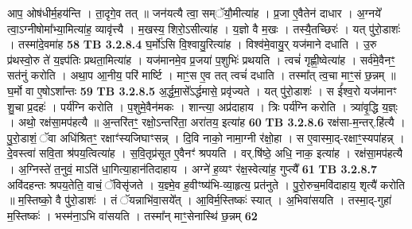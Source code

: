 \documentclass[17pt]{extarticle}
\begin{document}
{{{{{{{{{{{{{{{{{{{                  आप॒ ओष॑धीर्म॒हय॑न्ति । ता॒दृगे॒व तत् ॥ जन॑यत्यै त्वा॒ सम्ॅयौ॒मीत्या॑ह । प्र॒जा ए॒वैतेन॑ दाधार । अ॒ग्नये᳚ त्वा॒ऽग्नीषोमा᳚भ्या॒मित्या॑ह॒ व्यावृ॑त्त्यै । म॒खस्य॒ शिरो॒ऽसीत्या॑ह । य॒ज्ञो वै म॒खः । तस्यै॒तच्छिरः॑ । यत् पु॑रो॒डाशः॑ । तस्मा॑दे॒वमा॑ह \textbf{ 58} \newline
                  \newline
                                \textbf{ TB 3.2.8.4} \newline
                  घ॒र्मो॑ऽसि वि॒श्वायु॒रित्या॑ह । विश्व॑मे॒वायु॒र् यज॑माने दधाति । उ॒रु प्र॑थस्वो॒रु ते॑ य॒ज्ञ्प॑तिः प्रथता॒मित्या॑ह । यज॑मानमे॒व प्र॒जया॑ प॒शुभिः॑ प्रथयति । त्वचं॑ गृह्णी॒ष्वेत्या॑ह । सर्व॑मे॒वैनꣳ॒॒ सत॑नुं करोति । अथा॒प आ॒नीय॒ परि॑ मार्ष्टि । माꣳ॒॒स ए॒व तत् त्वचं॑ दधाति । तस्मा᳚त् त्व॒चा माꣳ॒॒सं छ॒न्नम् ॥ घ॒र्मो वा ए॒षोऽशा᳚न्तः \textbf{ 59} \newline
                  \newline
                                \textbf{ TB 3.2.8.5} \newline
                  अ॒र्द्ध॒मा॒से᳚ऽर्द्धमासे॒ प्रवृ॑ज्यते । यत् पु॑रो॒डाशः॑ । स ई᳚श्व॒रो यज॑मानꣳ शु॒चा प्र॒दहः॑ । पर्य॑ग्नि करोति । प॒शुमे॒वैन॑मकः । शान्त्या॒ अप्र॑दाहाय । त्रिः पर्य॑ग्नि करोति । त्र्या॑वृ॒द्धि य॒ज्ञ्ः । अथो॒ रक्ष॑सा॒मप॑हत्यै ॥ अ॒न्तरि॑तꣳ॒॒ रक्षो॒ऽन्तरि॑ता॒ अरा॑तय॒ इत्या॑ह \textbf{ 60} \newline
                  \newline
                                \textbf{ TB 3.2.8.6} \newline
                  रक्ष॑सा-म॒न्तर्.हि॑त्यै । पु॒रो॒डाशं॒ ॅवा अधि॑श्रितꣳ॒॒ रक्षाꣳ॑स्यजिघाꣳसन्न् । दि॒वि नाको॒ नामा॒ग्नी र॑क्षो॒हा । स ए॒वास्मा॒द्-रक्षाꣳ॒॒स्यपा॑हन्न् । दे॒वस्त्वा॑ सवि॒ता श्र॑पय॒त्वित्या॑ह । स॒वि॒तृप्र॑सूत ए॒वैनꣳ॑ श्रपयति । वर्.षि॑ष्ठे॒ अधि॒ नाक॒ इत्या॑ह । रक्ष॑सा॒मप॑हत्यै । अ॒ग्निस्ते॑ त॒नुवं॒ माऽति॑ धा॒गित्या॒हान॑तिदाहाय । अग्ने॑ ह॒व्यꣳ र॑क्ष॒स्वेत्या॑ह॒ गुप्त्यै᳚ \textbf{ 61} \newline
                  \newline
                                \textbf{ TB 3.2.8.7} \newline
                  अवि॑दहन्तः श्रपय॒तेति॒ वाचं॒ ॅविसृ॑जते । य॒ज्ञ्मे॒व ह॒वीꣳष्य॑भि-व्या॒हृत्य॒ प्रत॑नुते । पु॒रो॒रुच॒मवि॑दाहाय॒ शृत्यै॑ करोति ॥ म॒स्तिष्को॒ वै पु॑रो॒डाशः॑ । तं ॅयन्नाभि॑वा॒सये᳚त् । आ॒विर्म॒स्तिष्कः॑ स्यात् । अ॒भिवा॑सयति । तस्मा॒द्-गुहा॑ म॒स्तिष्कः॑ । भस्म॑ना॒ऽभि वा॑सयति । तस्मा᳚न् माꣳ॒॒सेनास्थि॑ छ॒न्नम् \textbf{ 62} \newline
                  \newline
}}}}}}}}}}}}}}}}}}}
\end{document}
